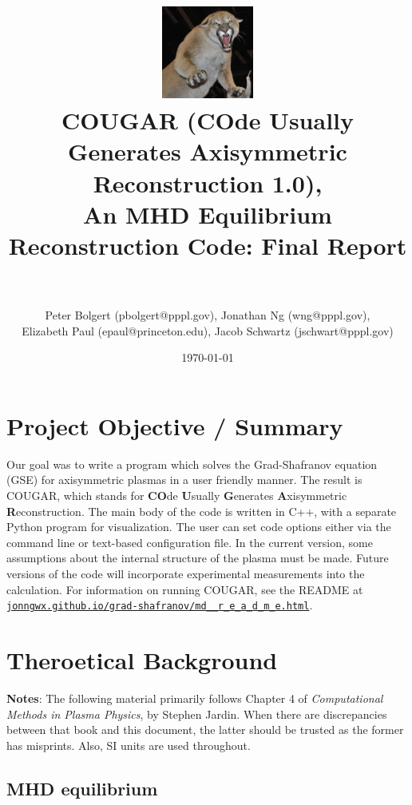 \documentclass[paper=letter, fontsize=11pt]{scrartcl} %
\title{	
\includegraphics[width=3cm]{Cougar_Nevada}
\normalfont \normalsize 
\horrule{0.5pt} \\[0.4cm] %
\LARGE COUGAR (\textbf{CO}de \textbf{U}sually \textbf{G}enerates \textbf{A}xisymmetric \textbf{R}econstruction 1.0), \\ \Large An MHD Equilibrium Reconstruction Code: Final Report\\ %
\horrule{2pt} \\[0.5cm] %
}
\author{Peter Bolgert (pbolgert@pppl.gov), Jonathan Ng (wng@pppl.gov), \\ Elizabeth Paul (epaul@princeton.edu), Jacob Schwartz (jschwart@pppl.gov)} %
\date{\normalsize\today} %
\begin{document}
\maketitle %


\section{Project Objective / Summary}

Our goal was to write a program which solves the Grad-Shafranov equation (GSE) for axisymmetric plasmas in a user friendly manner.  The result is COUGAR, which stands for \textbf{CO}de \textbf{U}sually \textbf{G}enerates \textbf{A}xisymmetric \textbf{R}econstruction.  The main body of the code is written in C++, with a separate Python program for visualization.  The user can set code options either via the command line or text-based configuration file.  In the current version, some assumptions about the internal structure of the plasma must be made.  Future versions of the code will incorporate experimental measurements into the calculation.  For information on running COUGAR, see the README at \href{http://jonngwx.github.io/grad-shafranov/md__r_e_a_d_m_e.html}{\nolinkurl{jonngwx.github.io/grad-shafranov/md__r_e_a_d_m_e.html}}.


\section{Theroetical Background}

\textbf{Notes}: The following material primarily follows Chapter 4 of \textit{Computational Methods in Plasma Physics}, by Stephen Jardin.  When there are discrepancies between that book and this document, the latter should be trusted as the former has misprints.  Also, SI units are used throughout.

\subsection{MHD equilibrium}
\end{document}
